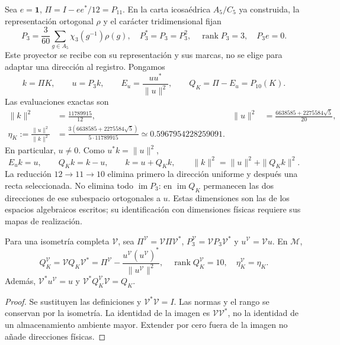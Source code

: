 Sea \(e=\mathbf1\), \(\Pi=I-ee^*/12=P_{11}\). En la carta
icosaédrica \(A_5/C_5\) ya construida, la representación ortogonal
\(\rho\) y el carácter tridimensional fijan
\begin{equation}
 P_3=\frac3{60}\sum_{g\in A_5}\chi_3(g^{-1})\rho(g),
 \quad P_3^*=P_3=P_3^2,\quad
 \operatorname{rank}P_3=3,\quad P_3e=0.
 \label{x_reciprocidad:lib01:P3}
\end{equation}
Este proyector se recibe con su representación y sus marcas, no se elige
para adaptar una dirección al registro. Pongamos
\[
 k=\Pi K,\qquad u=P_3k,\qquad
 E_u=\frac{uu^*}{\|u\|^2},\qquad Q_K=\Pi-E_u=P_{10}(K).
\]
Las evaluaciones exactas son
\begin{align}
 \|k\|^2&=\frac{11789915}{12},&
 \|u\|^2&=\frac{6638585+2275584\sqrt5}{20},
 \label{x_reciprocidad:lib01:normas-direccion}\\
 \eta_K:=\frac{\|u\|^2}{\|k\|^2}
 &=\frac{3(6638585+2275584\sqrt5)}{5\cdot11789915}
 \simeq0.5967954228259091.
 \label{x_reciprocidad:lib01:eta}
\end{align}
En particular, \(u\ne0\). Como \(u^*k=\|u\|^2\),
\begin{equation}
 E_uk=u,\qquad Q_Kk=k-u,\qquad
 k=u+Q_Kk,\qquad \|k\|^2=\|u\|^2+\|Q_Kk\|^2.
 \label{x_reciprocidad:lib01:particion-direccion}
\end{equation}
La reducción \(12\to11\to10\) elimina primero la dirección uniforme
y después una recta seleccionada. No elimina todo \(\operatorname{im}P_3\):
en \(\operatorname{im}Q_K\) permanecen las dos direcciones de ese
subespacio ortogonales a \(u\). Estas dimensiones son las de los
espacios algebraicos escritos; su identificación con dimensiones físicas
requiere sus mapas de realización.

\begin{proposition}
\label{x_reciprocidad:lib01:transporte-direccion}
Para una isometría completa \(\mathcal V\), sea
\(\Pi^{\mathcal V}=\mathcal V\Pi\mathcal V^*\),
\(P_3^{\mathcal V}=\mathcal VP_3\mathcal V^*\) y
\(u^{\mathcal V}=\mathcal Vu\). En \(\mathcal M\),
\[
 Q_K^{\mathcal V}
 =\mathcal VQ_K\mathcal V^*
 =\Pi^{\mathcal V}
 -\frac{u^{\mathcal V}(u^{\mathcal V})^*}{\|u^{\mathcal V}\|^2},
 \quad \operatorname{rank}Q_K^{\mathcal V}=10,
 \quad \eta_K^{\mathcal V}=\eta_K.
\]
Además, \(\mathcal V^*u^{\mathcal V}=u\) y
\(\mathcal V^*Q_K^{\mathcal V}\mathcal V=Q_K\).
\end{proposition}
\begin{proof}
Se sustituyen las definiciones y \(\mathcal V^*\mathcal V=I\).
Las normas y el rango se conservan por la isometría. La identidad de la
imagen es \(\mathcal V\mathcal V^*\), no la identidad de un
almacenamiento ambiente mayor. Extender por cero fuera de la imagen no
añade direcciones físicas.
\end{proof}

